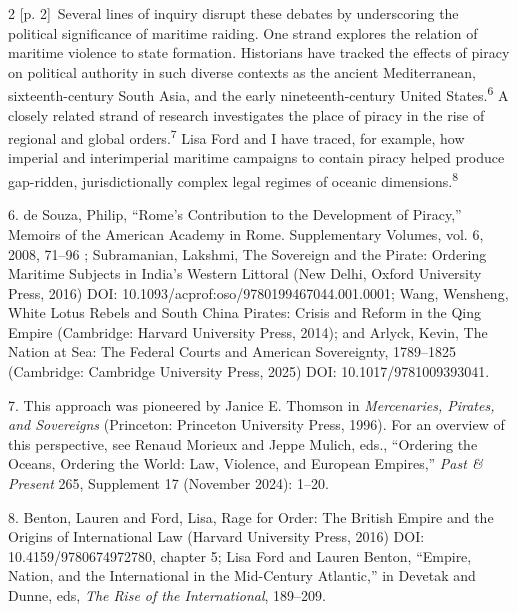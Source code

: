 \documentclass[10pt,a4paper]{article}
\begin{document}
\begin{paracol}{2}
{\scriptsize\color{gray} [p. 2]}\ Several lines of inquiry disrupt these debates by underscoring the political significance of maritime raiding. One strand explores the relation of maritime violence to state formation. Historians have tracked the effects of piracy on political authority in such diverse contexts as the ancient Mediterranean, sixteenth-century South Asia, and the early nineteenth-century United States.\nobreak\textsuperscript{6} A closely related strand of research investigates the place of piracy in the rise of regional and global orders.\nobreak\textsuperscript{7} Lisa Ford and I have traced, for example, how imperial and interimperial maritime campaigns to contain piracy helped produce gap-ridden, jurisdictionally complex legal regimes of oceanic dimensions.\nobreak\textsuperscript{8}\par{\small 6. de Souza, Philip, “Rome’s Contribution to the Development of Piracy,” Memoirs of the American Academy in Rome. Supplementary Volumes, vol. 6, 2008, 71–96 ; Subramanian, Lakshmi, The Sovereign and the Pirate: Ordering Maritime Subjects in India’s Western Littoral (New Delhi, Oxford University Press, 2016) DOI: 10.1093/acprof:oso/9780199467044.001.0001; Wang, Wensheng, White Lotus Rebels and South China Pirates: Crisis and Reform in the Qing Empire (Cambridge: Harvard University Press, 2014); and Arlyck, Kevin, The Nation at Sea: The Federal Courts and American Sovereignty, 1789–1825 (Cambridge: Cambridge University Press, 2025) DOI: 10.1017/9781009393041.\par}{\small 7. This approach was pioneered by Janice E. Thomson in \textit{Mercenaries, Pirates, and Sovereigns} (Princeton: Princeton University Press, 1996). For an overview of this perspective, see Renaud Morieux and Jeppe Mulich, eds., “Ordering the Oceans, Ordering the World: Law, Violence, and European Empires,” \textit{Past \& Present} 265, Supplement 17 (November 2024): 1–20.\par}{\small 8. Benton, Lauren and Ford, Lisa, Rage for Order: The British Empire and the Origins of International Law (Harvard University Press, 2016) DOI: 10.4159/9780674972780, chapter 5; Lisa Ford and Lauren Benton, “Empire, Nation, and the International in the Mid-Century Atlantic,” in Devetak and Dunne, eds, \textit{The Rise of the International}, 189–209.\par}
\switchcolumn*

\end{paracol}
\end{document}
